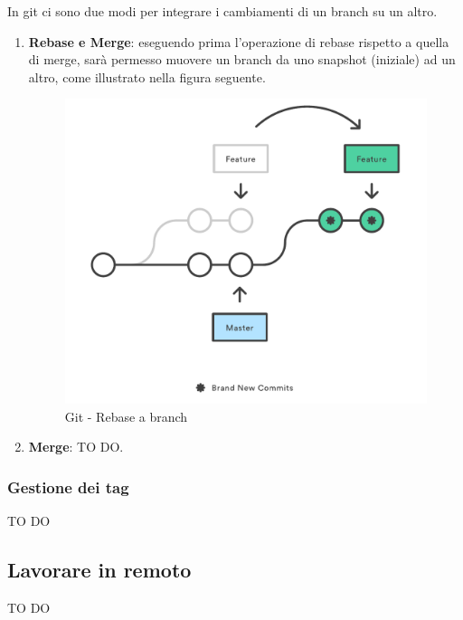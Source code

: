 		In git ci sono due modi per integrare i cambiamenti di un branch su un altro.
			\begin{enumerate}
				\item \textbf{Rebase e Merge}: eseguendo prima l'operazione di rebase rispetto a quella di merge, sarà permesso muovere un branch da uno snapshot (iniziale) ad un altro, come illustrato nella figura seguente.
					\begin{figure}[htbp]
						\centering
						\includegraphics[scale=0.6]{images/rebase.pdf}
						\caption{Git - Rebase a branch}
						\label{fig:git_rebase_a_branch}
					\end{figure}
				

				\item \textbf{Merge}: TO DO.

			\end{enumerate}


		\subsubsection{Gestione dei tag} %
		\label{ssub:gestione_dei_tag_locale}
		TO DO


	\subsection{Lavorare in remoto} %
	\label{sub:lavorare_in_remoto}
	TO DO
